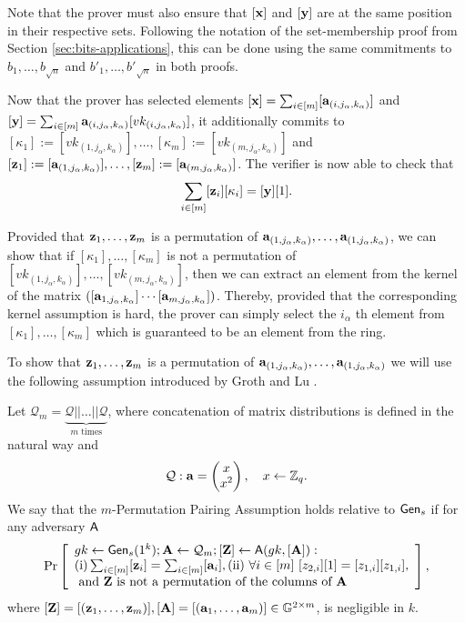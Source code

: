 Note that the prover must also ensure that $[\mathbf{x}]$ and $[\mathbf{y}]$ are at the same position in their respective sets. Following the notation of the set-membership proof from Section \ref{sec:bits-applications}, this can be done using the same commitments to $b_1,\ldots,b_{\sqrt{n}}$ and $b'_1,\ldots,b'_{\sqrt{n}}$ in both proofs.

Now that the prover has selected elements $[\mathbf{x}]=\sum_{i\in[m]}[\mathbf{a}_{(i,j_\alpha,k_\alpha)}]$ and $[\mathbf{y}]=\sum_{i\in[m]}\mathbf{a}_{(i,j_\alpha,k_\alpha)}[vk_{(i,j_\alpha,k_\alpha)}]$, it additionally commits to $[\kappa_1]:=[vk_{(1,j_\alpha,k_\alpha)}],\ldots,\allowbreak[\kappa_m]:=[vk_{(m,j_\alpha,k_\alpha)}]$ and $[\mathbf{z}_1]:=[\mathbf{a}_{(1,j_\alpha,k_\alpha)}],\ldots,[\mathbf{z}_m]:=[\mathbf{a}_{(m,j_\alpha,k_\alpha)}]$. The verifier is now able to check that
\begin{equation}
\sum_{i\in[m]}[\mathbf{z}_i][\kappa_i]=[\mathbf{y}][1]. \label{eq:verif1}
\end{equation}

Provided that $\mathbf{z}_1,\ldots,\mathbf{z}_m$ is a permutation of $\mathbf{a}_{(1,j_\alpha,k_\alpha)},\ldots,\mathbf{a}_{(1,j_\alpha,k_\alpha)}$,
we can show that if $[\kappa_1],\ldots,[\kappa_m]$ is not a permutation of $[vk_{(1,j_\alpha,k_\alpha)}],\ldots,\allowbreak[vk_{(m,j_\alpha,k_\alpha)}]$, then we can extract an element from the kernel of the matrix $([\mathbf{a}_{1,j_\alpha,k_\alpha}]\cdots\allowbreak [\mathbf{a}_{m,j_\alpha,k_\alpha}])$. Thereby, provided that the corresponding kernel assumption is hard, the prover can simply select the $i_\alpha$ th element from $[\kappa_1],\ldots,\allowbreak [\kappa_m]$ which is guaranteed to be an element from the ring.

To show that $\mathbf{z}_1,\ldots,\mathbf{z}_m$ is a permutation of $\mathbf{a}_{(1,j_\alpha,k_\alpha)},\ldots,\mathbf{a}_{(1,j_\alpha,k_\alpha)}$ we will use the following assumption introduced by Groth and Lu \cite{AC:GroLu07}.
\begin{definition}
Let $\mathcal{Q}_{m}=\underbrace{\mathcal{Q}||\ldots||\mathcal{Q}}_{m\text{ times}}$, where concatenation of matrix distributions is defined in the natural way and 
$$\mathcal{Q}: \mathbf{a}=\left(\begin{matrix}x\\x^2\end{matrix}\right),\quad x\gets\mathbb{Z}_q.$$
We say that the $m$-Permutation Pairing Assumption holds relative to $\mathsf{Gen}_s$ if for any adversary $\mathsf{A}$
$$
\Pr\left[
\begin{array}{l}
gk\gets\mathsf{Gen}_s(1^k);\mathbf{{A}}\gets\mathcal{Q}_{m};[\mathbf{{Z}}]\gets\mathsf{A}(gk,[\mathbf{{A}}]):\\
\mathrm{(i)} \sum_{i\in[m]}[\mathbf{z}_i]=\sum_{i\in[m]}[\mathbf{a}_i], \mathrm{(ii)}\ \forall i\in[m]\ [z_{2,i}][1]=[z_{1,i}][z_{1,i}],\\
\text{ and }\mathbf{{Z}}\text{ is not a permutation of the columns of }\mathbf{{A}}
\end{array}
\right],
$$
where $[\mathbf{{Z}}]=[(\mathbf{z}_1,\ldots,\mathbf{z}_m)],[\mathbf{A}]=[(\mathbf{a}_1,\ldots,\mathbf{a}_m)]\in\mathbb{G}^{2\times m}$,
is negligible in $k$.
\end{definition}

